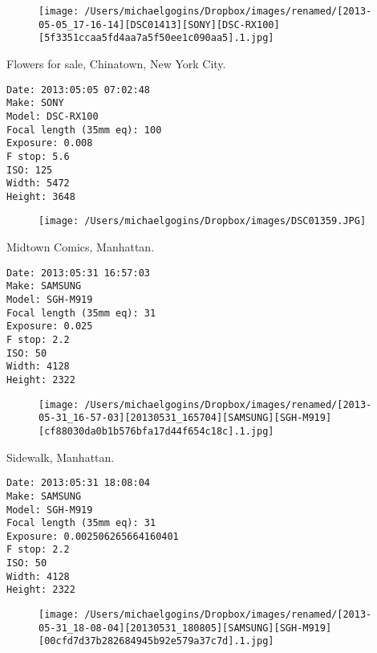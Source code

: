 \documentclass[11pt,letter,DIV=14,paper=landscape]{scrbook}
\begin{document}
\begin{figure}
\texttt{[image: /Users/michaelgogins/Dropbox/images/renamed/[2013-05-05\_17-16-14][DSC01413][SONY][DSC-RX100][5f3351ccaa5fd4aa7a5f50ee1c090aa5].1.jpg]}
\end{figure}
    
\clearpage
\noindent Flowers for sale, Chinatown, New York City.
\noindent
\begin{lstlisting}
Date: 2013:05:05 07:02:48
Make: SONY
Model: DSC-RX100
Focal length (35mm eq): 100
Exposure: 0.008
F stop: 5.6
ISO: 125
Width: 5472
Height: 3648
\end{lstlisting}
\clearpage

\begin{figure}
\texttt{[image: /Users/michaelgogins/Dropbox/images/DSC01359.JPG]}
\end{figure}
    
\clearpage
\noindent Midtown Comics, Manhattan.
\noindent
\begin{lstlisting}
Date: 2013:05:31 16:57:03
Make: SAMSUNG
Model: SGH-M919
Focal length (35mm eq): 31
Exposure: 0.025
F stop: 2.2
ISO: 50
Width: 4128
Height: 2322
\end{lstlisting}
\clearpage

\begin{figure}
\texttt{[image: /Users/michaelgogins/Dropbox/images/renamed/[2013-05-31\_16-57-03][20130531\_165704][SAMSUNG][SGH-M919][cf88030da0b1b576bfa17d44f654c18c].1.jpg]}
\end{figure}
    
\clearpage
\noindent Sidewalk, Manhattan.
\noindent
\begin{lstlisting}
Date: 2013:05:31 18:08:04
Make: SAMSUNG
Model: SGH-M919
Focal length (35mm eq): 31
Exposure: 0.002506265664160401
F stop: 2.2
ISO: 50
Width: 4128
Height: 2322
\end{lstlisting}
\clearpage

\begin{figure}
\texttt{[image: /Users/michaelgogins/Dropbox/images/renamed/[2013-05-31\_18-08-04][20130531\_180805][SAMSUNG][SGH-M919][00cfd7d37b282684945b92e579a37c7d].1.jpg]}
\end{figure}
    
\end{document}
